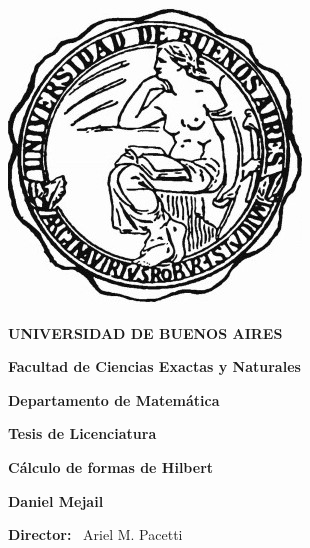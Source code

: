 \thispagestyle{empty}

\begin{center}

\includegraphics[scale=.3]{uba2.jpg}

\medskip
\textbf{UNIVERSIDAD DE BUENOS AIRES}

\smallskip

\textbf{Facultad de Ciencias Exactas y Naturales}

\smallskip

\textbf{Departamento de Matem\'atica}

\vspace{3.5cm}

\textbf{\large Tesis de Licenciatura}


\vspace{1.5cm}

\textbf{\large C\'{a}lculo de formas de Hilbert}

\vspace{1.5cm}


\textbf{Daniel Mejail}

\end {center}


\vspace{1.5cm}

\noindent \textbf{Director:} \ Ariel M. Pacetti


\vspace{3cm}


